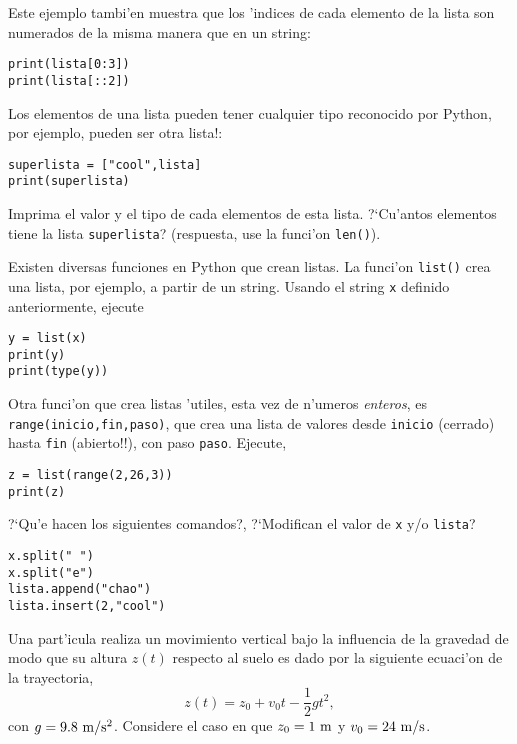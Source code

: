 \documentclass[11pt]{exam}
\begin{document}
\begin{questions}
Este ejemplo tambi'en muestra que los 'indices de cada elemento de la lista son numerados de la misma manera que en un string:

\begin{verbatim}
print(lista[0:3])
print(lista[::2])
\end{verbatim}

\item Los elementos de una lista pueden tener cualquier tipo reconocido por Python, por ejemplo, pueden ser otra lista!:

\begin{verbatim}
superlista = ["cool",lista]
print(superlista)
\end{verbatim}

Imprima el valor y el tipo de cada elementos de esta lista. ?`Cu'antos elementos tiene la lista \texttt{superlista}? (respuesta, use la funci'on \texttt{len()}).

\item Existen diversas funciones en Python que crean listas. La funci'on \texttt{list()} crea una lista, por ejemplo, a partir de un string. Usando el string \texttt{x} definido anteriormente, ejecute

\begin{verbatim}
y = list(x)
print(y)
print(type(y))
\end{verbatim}

\item Otra funci'on que crea listas 'utiles, esta vez de n'umeros \textit{enteros}, es \texttt{range(inicio,fin,paso)}, que crea una lista de valores desde \texttt{inicio} (cerrado) hasta \texttt{fin} (abierto!!), con paso \texttt{paso}. Ejecute,

\begin{verbatim}
z = list(range(2,26,3))
print(z)
\end{verbatim}

\item ?`Qu'e hacen los siguientes comandos?, ?`Modifican el valor de \texttt{x} y/o \texttt{lista}?

\begin{verbatim}
x.split(" ")
x.split("e")
lista.append("chao")
lista.insert(2,"cool")
\end{verbatim}


\item Una part'icula realiza un movimiento vertical bajo la influencia de la gravedad de modo que su altura $z(t)$ respecto al suelo es dado por la siguiente ecuaci'on de la trayectoria,
\begin{equation}
z(t)=z_0 + v_0 t -\frac{1}{2}gt^2,
\end{equation}
con $g=9.8 {\ \rm m/s^2}$. Considere el caso en que $z_0=1 {\ \rm m}$ y $v_0=24 {\ \rm m/s}$.


\end{questions}
\end{document}
